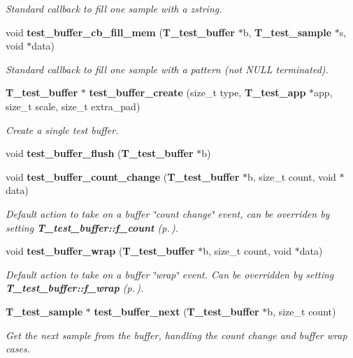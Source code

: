 \begin{CompactItemize}
\begin{CompactList}\small\item\em Standard callback to fill one sample with a zstring.\item\end{CompactList}\item 
void {\bf test\_\-buffer\_\-cb\_\-fill\_\-mem} ({\bf T\_\-test\_\-buffer} $\ast$b, {\bf T\_\-test\_\-sample} $\ast$s, void $\ast$data)
\begin{CompactList}\small\item\em Standard callback to fill one sample with a pattern (not NULL terminated).\item\end{CompactList}\item 
{\bf T\_\-test\_\-buffer} $\ast$ {\bf test\_\-buffer\_\-create} (size\_\-t type, {\bf T\_\-test\_\-app} $\ast$app, size\_\-t scale, size\_\-t extra\_\-pad)
\begin{CompactList}\small\item\em Create a single test buffer.\item\end{CompactList}\item 
void {\bf test\_\-buffer\_\-flush} ({\bf T\_\-test\_\-buffer} $\ast$b)
\item 
void {\bf test\_\-buffer\_\-count\_\-change} ({\bf T\_\-test\_\-buffer} $\ast$b, size\_\-t count, void $\ast$data)
\begin{CompactList}\small\item\em Default action to take on a buffer \char`\"{}count change\char`\"{} event, can be overriden by setting {\bf T\_\-test\_\-buffer::f\_\-count} {\rm (p.\,\pageref{structT__test__buffer_m22})}.\item\end{CompactList}\item 
void {\bf test\_\-buffer\_\-wrap} ({\bf T\_\-test\_\-buffer} $\ast$b, size\_\-t count, void $\ast$data)
\begin{CompactList}\small\item\em Default action to take on a buffer \char`\"{}wrap\char`\"{} event. Can be overridden by setting {\bf T\_\-test\_\-buffer::f\_\-wrap} {\rm (p.\,\pageref{structT__test__buffer_m20})}.\item\end{CompactList}\item 
{\bf T\_\-test\_\-sample} $\ast$ {\bf test\_\-buffer\_\-next} ({\bf T\_\-test\_\-buffer} $\ast$b, size\_\-t count)
\begin{CompactList}\small\item\em Get the next sample from the buffer, handling the count change and buffer wrap cases.\item\end{CompactList}\end{CompactItemize}


